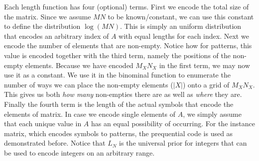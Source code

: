 \documentclass{llncs}
\begin{document}
Each length function has four (optional) terms. First we encode the total size of the matrix. Since we assume $MN$ to be known/constant, we can use this constant to define the distribution $\log(MN)$. This is simply an uniform distribution that encodes an arbitrary index of $A$ with equal lengths for each index. Next we encode the number of elements that are non-empty. Notice how for patterns, this value is encoded together with the third term, namely the positions of the non-empty elements. Because we have encoded $M_XN_X$ in the first term, we may now use it as a constant. We use it in the binominal function to enumerate the number of ways we can place the non-empty elements ($|X|$) onto a grid of $M_XN_X$. This gives us both \emph{how many} non-empties there are as well as \emph{where} they are. Finally the fourth term is the length of the actual symbols that encode the elements of matrix. In case we encode single elements of $A$, we simply assume that each unique value in $A$ has an equal possibility of occurring. For the instance matrix, which encodes symbols to patterns, the prequential code is used as demonstrated before. Notice that $L_N$ is the universal prior for integers\cite{integerprior} that can be used to encode integers on an arbitrary range.


\end{document}
